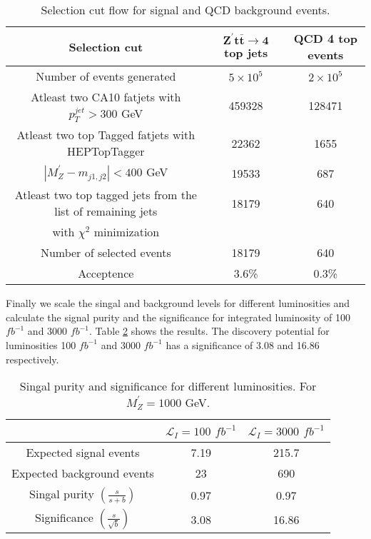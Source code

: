 \documentclass[12pt,a4paper]{article}		%
\begin{document}
\begin{table}[h!]
	\caption{ Selection cut flow for signal and QCD background events. }
	\centering
	\begin{tabular}{ |c|c|c| }
		\hline
	\textbf{Selection cut}	& $ \mathbf{Z^\prime t \bar{t} \to 4 }$ top jets & \textbf{QCD 4 top events}\\
		\hline
 Number of events generated  & $5 \times 10^5$  &	$2 \times 10^5$\\
   \hline
	Atleast two CA10 fatjets with $p_T^{jet} > 300$ GeV & 459328 & 128471 \\
	\hline 
	Atleast two top Tagged fatjets with HEPTopTagger & 22362 & 1655\\
	\hline
	 $ |M_Z^\prime - m_{j1, j2}| < 400$ GeV & 19533 & 687\\
	 \hline
	 Atleast two top tagged jets from the list of remaining jets  & 18179& 640 \\
	 with $\chi^2$ minimization  &&\\	
	\hline 
   Number of selected events & 18179 & 640\\	
    \hline 
	Acceptence & 3.6\% & 0.3\% \\ 	
	\hline
	\end{tabular}
	\label{zptt}
\end{table}
  
Finally we scale the singal and background levels for different luminosities and calculate the signal purity and the significance for integrated luminosity of 100 $fb^{-1}$ and 3000 $fb^{-1}$. Table \ref{final} shows the results. The discovery potential for luminosities 100 $fb^{-1}$ and 3000 $fb^{-1}$ has a significance of 3.08 and 16.86 respectively.   

\begin{table}[h!]
	\caption{ Singal purity and significance for different luminosities. For $M_Z^\prime = 1000$ GeV. }
	\centering
	\begin{tabular}{ |c|c|c| }
		\hline
			& $\mathcal{L}_I = 100$ $fb^{-1}$ & $\mathcal{L}_I = 3000$ $fb^{-1}$\\
		\hline
		Expected signal events & 7.19 & 215.7 \\
		\hline
		Expected background events & 23 & 690 \\
		\hline 
		 Singal purity $ \left( \frac{s}{s+b} \right)$	&  0.97  & 0.97 \\
		\hline
		 Significance  $ \left( \frac{s}{\sqrt{b}} \right) $&  3.08 & 16.86\\
		 \hline		 
	\end{tabular}
	\label{final}
\end{table}
\end{document}

